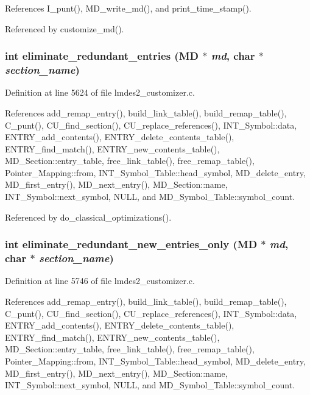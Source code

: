 References I\_\-punt(), MD\_\-write\_\-md(), and print\_\-time\_\-stamp().

Referenced by customize\_\-md().
\subsubsection{\setlength{\rightskip}{0pt plus 5cm}int eliminate\_\-redundant\_\-entries (\bf{MD} $\ast$ {\em md}, char $\ast$ {\em section\_\-name})}\label{lmdes2__customizer_8c_31d467358cd44db3f94464165d183232}




Definition at line 5624 of file lmdes2\_\-customizer.c.

References add\_\-remap\_\-entry(), build\_\-link\_\-table(), build\_\-remap\_\-table(), C\_\-punt(), CU\_\-find\_\-section(), CU\_\-replace\_\-references(), INT\_\-Symbol::data, ENTRY\_\-add\_\-contents(), ENTRY\_\-delete\_\-contents\_\-table(), ENTRY\_\-find\_\-match(), ENTRY\_\-new\_\-contents\_\-table(), MD\_\-Section::entry\_\-table, free\_\-link\_\-table(), free\_\-remap\_\-table(), Pointer\_\-Mapping::from, INT\_\-Symbol\_\-Table::head\_\-symbol, MD\_\-delete\_\-entry, MD\_\-first\_\-entry(), MD\_\-next\_\-entry(), MD\_\-Section::name, INT\_\-Symbol::next\_\-symbol, NULL, and MD\_\-Symbol\_\-Table::symbol\_\-count.

Referenced by do\_\-classical\_\-optimizations().
\subsubsection{\setlength{\rightskip}{0pt plus 5cm}int eliminate\_\-redundant\_\-new\_\-entries\_\-only (\bf{MD} $\ast$ {\em md}, char $\ast$ {\em section\_\-name})}\label{lmdes2__customizer_8c_4286ee81d149a7bd3dda9056304a94bd}




Definition at line 5746 of file lmdes2\_\-customizer.c.

References add\_\-remap\_\-entry(), build\_\-link\_\-table(), build\_\-remap\_\-table(), C\_\-punt(), CU\_\-find\_\-section(), CU\_\-replace\_\-references(), INT\_\-Symbol::data, ENTRY\_\-add\_\-contents(), ENTRY\_\-delete\_\-contents\_\-table(), ENTRY\_\-find\_\-match(), ENTRY\_\-new\_\-contents\_\-table(), MD\_\-Section::entry\_\-table, free\_\-link\_\-table(), free\_\-remap\_\-table(), Pointer\_\-Mapping::from, INT\_\-Symbol\_\-Table::head\_\-symbol, MD\_\-delete\_\-entry, MD\_\-first\_\-entry(), MD\_\-next\_\-entry(), MD\_\-Section::name, INT\_\-Symbol::next\_\-symbol, NULL, and MD\_\-Symbol\_\-Table::symbol\_\-count.

